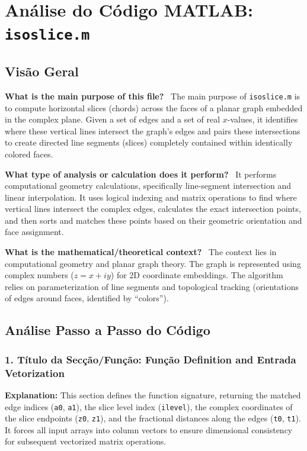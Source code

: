 \chapter{Análise do Código MATLAB: \texttt{isoslice.m}}
\section{Visão Geral}

\textbf{What is the main purpose of this file?} \
The main purpose of \texttt{isoslice.m} is to compute horizontal slices (chords) across the faces of a planar graph embedded in the complex plane. Given a set of edges and a set of real $x$-values, it identifies where these vertical lines intersect the graph's edges and pairs these intersections to create directed line segments (slices) completely contained within identically colored faces.

\textbf{What type of analysis or calculation does it perform?} \
It performs computational geometry calculations, specifically line-segment intersection and linear interpolation. It uses logical indexing and matrix operations to find where vertical lines intersect the complex edges, calculates the exact intersection points, and then sorts and matches these points based on their geometric orientation and face assignment.

\textbf{What is the mathematical/theoretical context?} \
The context lies in computational geometry and planar graph theory. The graph is represented using complex numbers ($z = x + iy$) for 2D coordinate embeddings. The algorithm relies on parameterization of line segments and topological tracking (orientations of edges around faces, identified by ``colors'').

\section{Análise Passo a Passo do Código}

\subsection*{1. Título da Secção/Função: Função Definition and Entrada Vetorization}
\textbf{Explanation:} This section defines the function signature, returning the matched edge indices (\texttt{a0}, \texttt{a1}), the slice level index (\texttt{ilevel}), the complex coordinates of the slice endpoints (\texttt{z0}, \texttt{z1}), and the fractional distances along the edges (\texttt{t0}, \texttt{t1}). It forces all input arrays into column vectors to ensure dimensional consistency for subsequent vectorized matrix operations.

